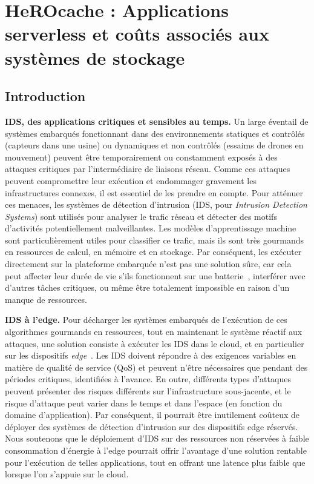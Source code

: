 \chapter{HeROcache : Applications serverless et coûts associés aux systèmes de stockage}
\label{chapter:herocache}

\section{Introduction}
\label{section:herocache-introduction}


\textbf{IDS, des applications critiques et sensibles au temps.} Un large éventail de systèmes embarqués fonctionnant dans des environnements statiques et contrôlés (capteurs dans une usine) ou dynamiques et non contrôlés (essaims de drones en mouvement) peuvent être temporairement ou constamment exposés à des attaques critiques par l'intermédiaire de liaisons réseau. Comme ces attaques peuvent compromettre leur exécution et endommager gravement les infrastructures connexes, il est essentiel de les prendre en compte. Pour atténuer ces menaces, les systèmes de détection d'intrusion (IDS, pour \textit{Intrusion Detection Systems}) sont utilisés pour analyser le trafic réseau et détecter des motifs d'activités potentiellement malveillantes. Les modèles d'apprentissage machine sont particulièrement utiles pour classifier ce trafic, mais ils sont très gourmands en ressources de calcul, en mémoire et en stockage. Par conséquent, les exécuter directement sur la plateforme embarquée n'est pas une solution sûre, car cela peut affecter leur durée de vie s'ils fonctionnent sur une batterie~\cite{slimani:hal-04159551}, interférer avec d'autres tâches critiques, ou même être totalement impossible en raison d'un manque de ressources.

\textbf{IDS à l'edge.} Pour décharger les systèmes embarqués de l'exécution de ces algorithmes gourmands en ressources, tout en maintenant le système réactif aux attaques, une solution consiste à exécuter les IDS dans le cloud, et en particulier sur les dispositifs \textit{edge}~\cite{eskandari2020}. Les IDS doivent répondre à des exigences variables en matière de qualité de service (QoS) et peuvent n'être nécessaires que pendant des périodes critiques, identifiées à l'avance. En outre, différents types d'attaques peuvent présenter des risques différents sur l'infrastructure sous-jacente, et le risque d'attaque peut varier dans le temps et dans l'espace (en fonction du domaine d'application). Par conséquent, il pourrait être inutilement coûteux de déployer des systèmes de détection d'intrusion sur des dispositifs edge réservés. Nous soutenons que le déploiement d'IDS sur des ressources non réservées à faible consommation d'énergie à l'edge pourrait offrir l'avantage d'une solution rentable pour l'exécution de telles applications, tout en offrant une latence plus faible que lorsque l'on s'appuie sur le cloud.

